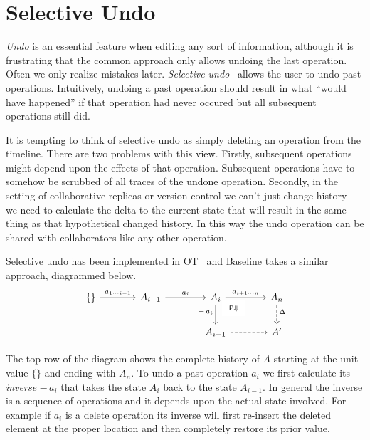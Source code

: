 \documentclass[english,submission]{programming}
\theoremstyle{definition}
\begin{document}
\section{Selective Undo}\label{undo}

\textit{Undo} is an essential feature when editing any sort of information, although it is frustrating that the common approach only allows undoing the last operation. Often we only realize mistakes later. \textit{Selective undo}~\cite{berlage94} allows the user to undo past operations. Intuitively, undoing a past operation should result in what ``would have happened'' if that operation had never occured but all subsequent operations still did.

It is tempting to think of selective undo as simply deleting an operation from the timeline. There are two problems with this view. Firstly, subsequent operations might depend upon the effects of that operation. Subsequent operations have to somehow be scrubbed of all traces of the undone operation. Secondly, in the setting of collaborative replicas or version control we can't just change history---we need to calculate the delta to the current state that will result in the same thing as that hypothetical changed history. In this way the undo operation can be shared with collaborators like any other operation.

Selective undo has been implemented in OT~\cite{sun00, weiss08} and Baseline takes a similar approach, diagrammed below.
\[\begin{tikzcd}[column sep=large]
	{\{\}} & {A_{i-1}} & {A_i} & {A_n} \\
	&& {A_{i-1}} & {A'}
	\arrow["{{{a_{1 \cdots i-1}}}}", from=1-1, to=1-2]
	\arrow["{{{a_i}}}", from=1-2, to=1-3]
	\arrow["{{{a_{i+1 \cdots n}}}}", from=1-3, to=1-4]
	\arrow["{{{-\, a_i}}}"'{pos=0.33}, from=1-3, to=2-3]
	\arrow["{{\begin{array}{c} \textsf{P}\Downarrow \end{array}}}"{description, pos=0.2}, draw=none, from=1-3, to=2-4]
	\arrow["{{{\Delta}}}"{pos=0.33}, dashed, from=1-4, to=2-4]
	\arrow[dashed, from=2-3, to=2-4]
\end{tikzcd}\]

The top row of the diagram shows the complete history of $A$ starting at the unit value $\{\}$ and ending with $A_n$. To undo a past operation $a_i$ we first calculate its \textit{inverse} $- \, a_i$ that takes the state $A_i$ back to the state $A_{i-1}$. In general the inverse is a sequence of operations and it depends upon the actual state involved. For example if $a_i$ is a \textsf{delete} operation its inverse will first re-insert the deleted element at the proper location and then completely restore its prior value.
\end{document}
